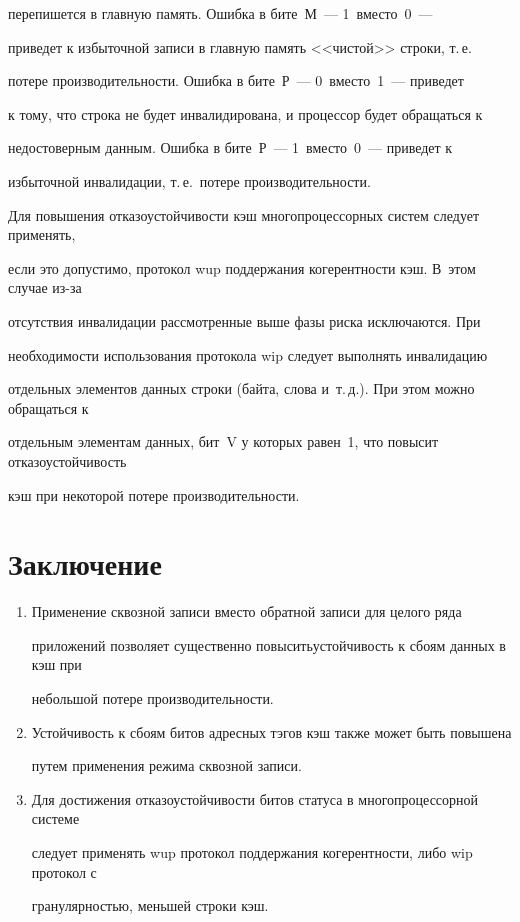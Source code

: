перепишется в  главную память.  Ошибка в бите~М~--- 1~вмес\-то~0~--- 


приведет к избыточной записи в главную память <<чис\-той>> строки, т.\,е.\ 


потере производительности. Ошибка в бите~Р~--- 0~вмес\-то~1~--- приведет 


к тому, что строка не будет инвалидирована, и процессор будет обращаться к 


недостоверным данным.  Ошибка в бите~Р~--- 1~вмес\-то~0~--- приведет к 


избыточной инвалидации, т.\,е.\ потере производительности.





Для повышения отказоустойчивости кэш многопроцессорных систем следует применять, 


если это допустимо, протокол wup поддержания когерентности кэш. В~этом случае из-за 


отсутствия инвалидации рассмотренные выше фазы риска исключаются. При 


необходимости использования протокола  wip  следует выполнять инвалидацию 


отдельных элементов данных строки (байта, слова и~т.\,д.). При этом можно обращаться к 


отдельным элементам данных, бит~V у которых равен~1, что повысит отказоустойчивость 


кэш при некоторой потере производительности.





\section{Заключение}





\noindent


\begin{enumerate}[1.]


\item Применение сквозной записи вместо обратной записи для целого ряда 


приложений позволяет существенно повысить\linebreak устойчивость к сбоям данных в кэш при 


небольшой потере производительности. 


\item Устойчивость к сбоям битов адресных тэгов кэш также может быть повышена 


путем применения режима сквозной записи.


\item Для достижения отказоустойчивости битов статуса в многопроцессорной системе 


следует применять wup протокол поддержания когерентности, либо wip протокол с 


грану\-ляр\-ностью, меньшей строки кэш.  


\end{enumerate}








